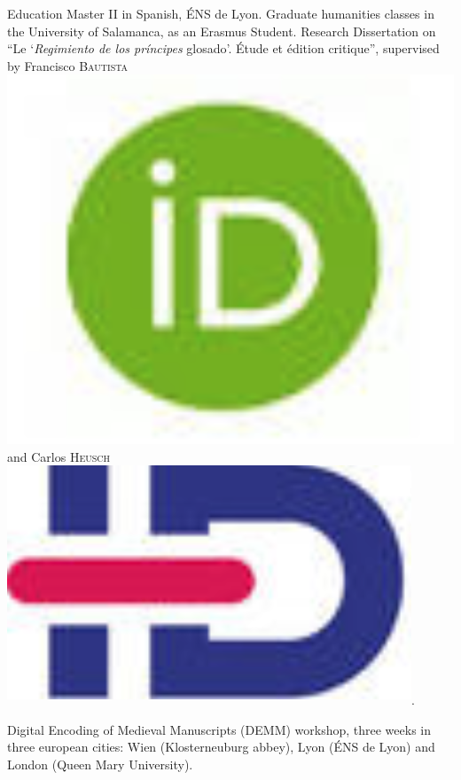 \begin{rubric}{Education}
                                \entry*[2015-2016]
                            Master II in Spanish, ÉNS de Lyon. Graduate humanities classes in the
                        University of Salamanca, as an Erasmus Student. Research Dissertation on
                        \enquote{Le \enquote{\textit{Regimiento de los príncipes} glosado}.
                        Étude et édition critique}, supervised by Francisco \textsc{Bautista}\href{https://orcid.org/0000-0002-2676-0388}{\includegraphics[scale=0.025]{img/orcid.png}} and Carlos \textsc{Heusch}\href{https://www.idref.fr/055838413}{\textsuperscript{\includegraphics[scale=0.025]{img/idref.png}}}.
                    
                                \entry*
                            Digital Encoding of Medieval Manuscripts (DEMM) workshop, three weeks
                        in three european cities: Wien (Klosterneuburg abbey), Lyon (ÉNS de Lyon)
                        and London (Queen Mary University).
                    

\end{rubric}
